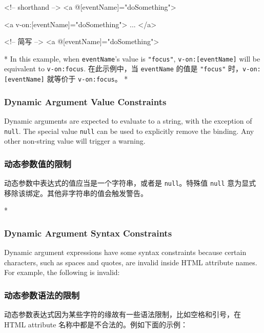 \begin{paracol}{2}
\begin{codeHtml}
<!-- shorthand -->
<a @[eventName]="doSomething">
\end{codeHtml}  
\switchcolumn
\begin{codeHtml}
<a v-on:[eventName]="doSomething"> ... </a>

<!-- 简写 -->
<a @[eventName]="doSomething">
\end{codeHtml}  
\switchcolumn[0]*%
In this example, when \texttt{eventName}'s value is \texttt{"focus"},
\texttt{v-on:{[}eventName{]}} will be equivalent to \texttt{v-on:focus}.
\switchcolumn
在此示例中，当 \texttt{eventName} 的值是 \texttt{"focus"}
时，\texttt{v-on:{[}eventName{]}} 就等价于 \texttt{v-on:focus}。 
\switchcolumn[0]*%
\subsubsection{Dynamic Argument Value Constraints}%

Dynamic arguments are expected to evaluate to a string, with the
exception of \texttt{null}. The special value \texttt{null} can be used
to explicitly remove the binding. Any other non-string value will
trigger a warning.
\switchcolumn
\subsubsection{动态参数值的限制}

动态参数中表达式的值应当是一个字符串，或者是 \texttt{null}。特殊值
\texttt{null} 意为显式移除该绑定。其他非字符串的值会触发警告。

\switchcolumn[0]*%
\subsubsection{Dynamic Argument Syntax Constraints}

Dynamic argument expressions have some syntax constraints because
certain characters, such as spaces and quotes, are invalid inside HTML
attribute names. For example, the following is invalid:
\switchcolumn
\subsubsection{动态参数语法的限制}

动态参数表达式因为某些字符的缘故有一些语法限制，比如空格和引号，在 HTML
attribute 名称中都是不合法的。例如下面的示例：


\end{paracol}
